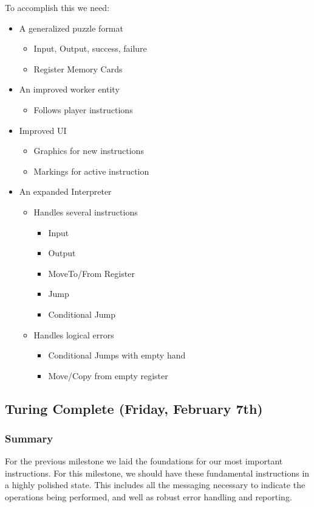 To accomplish this we need:
\begin{itemize}
  \item A generalized puzzle format
  \begin{itemize}
    \item Input, Output, success, failure
    \item Register Memory Cards
  \end{itemize}
  \item An improved worker entity
  \begin{itemize}
    \item Follows player instructions
  \end{itemize}
  \item Improved UI
  \begin{itemize}
    \item Graphics for new instructions
    \item Markings for active instruction
  \end{itemize}
  \item An expanded Interpreter
  \begin{itemize}
    \item Handles several instructions
    \begin{itemize}
      \item Input
      \item Output
      \item MoveTo/From Register
      \item Jump
      \item Conditional Jump
    \end{itemize}
    \item Handles logical errors
    \begin{itemize}
      \item Conditional Jumps with empty hand
      \item Move/Copy from empty register
    \end{itemize}
  \end{itemize}
\end{itemize}

\subsection{Turing Complete (Friday, February 7th)}

\subsubsection*{Summary}
For the previous milestone we laid the foundations for our most important
instructions. For this milestone, we should have these fundamental instructions
in a highly polished state. This includes all the messaging necessary to
indicate the operations being performed, and well as robust error handling and
reporting.

